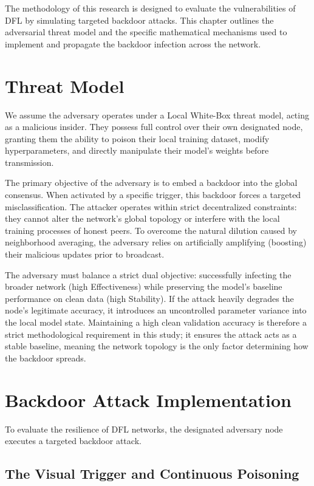 The methodology of this research is designed to evaluate the vulnerabilities of DFL by simulating targeted backdoor attacks. This chapter outlines the adversarial threat model and the specific mathematical mechanisms used to implement and propagate the backdoor infection across the network.

\section{Threat Model}
We assume the adversary operates under a Local White-Box threat model, acting as a malicious insider. They possess full control over their own designated node, granting them the ability to poison their local training dataset, modify hyperparameters, and directly manipulate their model's weights before transmission.

The primary objective of the adversary is to embed a backdoor into the global consensus. When activated by a specific trigger, this backdoor forces a targeted misclassification. The attacker operates within strict decentralized constraints: they cannot alter the network's global topology or interfere with the local training processes of honest peers. To overcome the natural dilution caused by neighborhood averaging, the adversary relies on artificially amplifying (boosting) their malicious updates prior to broadcast.

The adversary must balance a strict dual objective: successfully infecting the broader network (high Effectiveness) while preserving the model's baseline performance on clean data (high Stability). If the attack heavily degrades the node's legitimate accuracy, it introduces an uncontrolled parameter variance into the local model state. Maintaining a high clean validation accuracy is therefore a strict methodological requirement in this study; it ensures the attack acts as a stable baseline, meaning the network topology is the only factor determining how the backdoor spreads.

\section{Backdoor Attack Implementation} \label{sec:backdoor_implementation}
To evaluate the resilience of DFL networks, the designated adversary node executes a targeted backdoor attack.

\subsection{The Visual Trigger and Continuous Poisoning}

